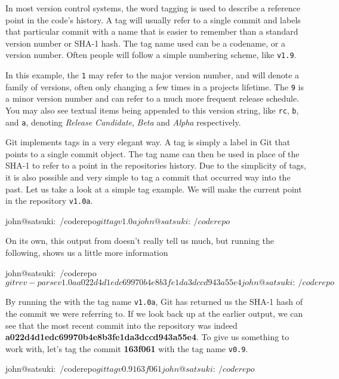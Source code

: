 In most version control systems, the word tagging is used to describe a reference point in the code's history.
A tag will usually refer to a single commit and labels that particular commit with a name that is easier to remember than a standard version number or SHA-1 hash.
The tag name used can be a codename, or a version number.
Often people will follow a simple numbering scheme, like \texttt{v1.9}.

In this example, the \texttt{1} may refer to the major version number, and will denote a family of versions, often only changing a few times in a projects lifetime.
The \texttt{9} is a minor version number and can refer to a much more frequent release schedule.
You may also see textual items being appended to this version string, like \texttt{rc}, \texttt{b}, and \texttt{a}, denoting \emph{Release Candidate}, \emph{Beta} and \emph{Alpha} respectively.

Git implements tags in a very elegant way.
A tag is simply a label in Git that points to a single commit object.
The tag name can then be used in place of the SHA-1 to refer to a point in the repositories history.
Due to the simplicity of tags, it is also possible and very simple to tag a commit that occurred way into the past.
Let us take a look at a simple tag example.
We will make the current point in the repository \texttt{v1.0a}.

\begin{code}
john@satsuki:~/coderepo$ git tag v1.0a
john@satsuki:~/coderepo$
\end{code}

On its own, this output from  doesn't really tell us much, but running the following, shows us a little more information

\begin{code}
john@satsuki:~/coderepo$ git rev-parse v1.0a
a022d4d1edc69970b4e8b3fe1da3dccd943a55e4
john@satsuki:~/coderepo$
\end{code}

By running the  with the tag name \texttt{v1.0a}, Git has returned us the SHA-1 hash of the commit we were referring to.
If we look back up at the earlier output, we can see that the most recent commit into the repository was indeed \textbf{a022d4d1edc69970b4e8b3fe1da3dccd943a55e4}.
To give us something to work with, let's tag the commit \textbf{163f061} with the tag name \texttt{v0.9}.

\begin{code}
john@satsuki:~/coderepo$ git tag v0.9 163f061
john@satsuki:~/coderepo$
\end{code}

